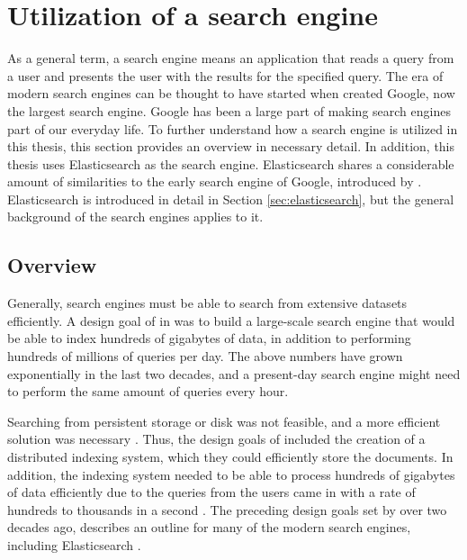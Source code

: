 \section{Utilization of a search engine}

As a general term, a search engine means an application that reads a query from a user and 
presents the user with the results for the specified query. 
The era of modern search engines can be thought to have started when
\citeauthor{googleInit} \cite{googleInit} created Google,
now the largest search engine. 
Google has been a large part of making search engines part of our everyday life.
To further understand how a search engine is utilized in this thesis, this section
provides an overview in necessary detail.
In addition, this thesis uses Elasticsearch as the search engine.
Elasticsearch shares a considerable amount
of similarities to the early search engine of Google, introduced by 
\citeauthor{googleInit} \cite{googleInit}.
Elasticsearch is introduced in detail in Section \ref{sec:elasticsearch}, but the general
background of the search engines applies to it.


\subsection{Overview}

Generally, search engines must be able to search from extensive datasets efficiently.
A design goal of \citeauthor{googleInit} \cite{googleInit} in \citeyear{googleInit}
was to build a large-scale search engine 
that would be able to index hundreds of gigabytes of data, in addition to
performing hundreds of millions of queries per day.
The above numbers have grown exponentially in the last two decades, and a present-day
search engine might need to perform the same amount of queries every hour.

Searching from persistent storage or disk was not feasible, and a more efficient 
solution was necessary \cite{googleInit}. 
Thus, the design goals of \citeauthor{googleInit} \cite{googleInit} included the creation of 
a distributed indexing system, 
which they could efficiently store the documents. 
In addition, the indexing system needed to be able to process hundreds of gigabytes of data efficiently 
due to the queries from the users came in with a rate of hundreds to thousands in 
a second \cite{googleInit}. 
The preceding design goals set by \citeauthor{googleInit} \cite{googleInit}
over two decades ago,
describes an outline for many of the modern search engines, 
including Elasticsearch \cite{relevantSearch}.

